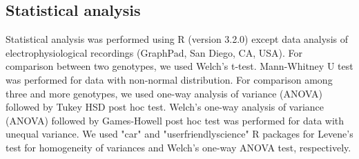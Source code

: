 \subsection*{Statistical analysis}

Statistical analysis was performed using R (version 3.2.0)\cite{R} except data analysis of electrophysiological recordings (GraphPad, San Diego, CA, USA).
For comparison between two genotypes, we used Welch's t-test.
Mann-Whitney U test was performed for data with non-normal distribution.
For comparison among three and more genotypes, we used one-way analysis of variance (ANOVA) followed by Tukey HSD post hoc test. 
Welch's one-way analysis of variance (ANOVA) followed by Games-Howell post hoc test was performed for data with unequal variance.
We used "car"\cite{car} and "userfriendlyscience"\cite{user} R packages for Levene's test for homogeneity of variances and Welch's one-way ANOVA test, respectively. 
  
  
  
  
  
  
  
  